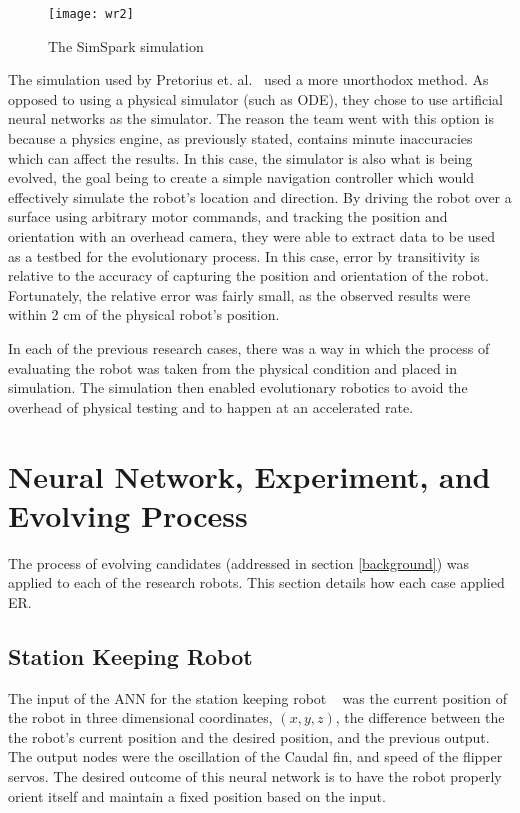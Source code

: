 \documentclass{sig-alternate}
\begin{document}
 \begin{figure}%
 \begin{center}
  \texttt{[image: wr2]}
 \end{center}
\caption{The SimSpark simulation}
\label{fig:simSpark}
\end{figure}
 
 The simulation used by Pretorius et. al.~\cite{Pretorius:2009:TAN:1632149.1632171} used a more unorthodox method. As opposed to using a physical simulator (such as ODE), they chose to use artificial neural networks as the simulator. The reason the team went with this option is because a physics engine, as previously stated, contains minute inaccuracies which can affect the results. In this case, the simulator is also what is being evolved, the goal being to create a simple navigation controller which would effectively simulate the robot's location and direction. By driving the robot over a surface using arbitrary motor commands, and tracking the position and orientation with an overhead camera, they were able to extract data to be used as a testbed for the evolutionary process. In this case, error by transitivity is relative to the accuracy of capturing the position and orientation of the robot. Fortunately, the relative error was fairly small, as the observed results were within 2 cm of the physical robot's position. 
 
 In each of the previous research cases, there was a way in which the process of evaluating the robot was taken from the physical condition and placed in simulation. The simulation then enabled evolutionary robotics to avoid the overhead of physical testing and to happen at an accelerated rate.

\section{Neural Network, Experiment, and Evolving Process}\label{evolution}
  The process of evolving candidates (addressed in section \ref{background}) was applied to each of the research robots. This section details how each case applied ER.
  \subsection{Station Keeping Robot}\label{Moore Evolving}
  The input of the ANN for the station keeping robot ~\cite{Moore:2013:ESK:2463372.2463402} was the current position of the robot in three dimensional coordinates, $(x,y,z)$, the difference between the the robot's current position and the desired position, and the previous output. The output nodes were the oscillation of the Caudal fin, and speed of the flipper servos. The desired outcome of this neural network is to have the robot properly orient itself and maintain a fixed position based on the input.
  
\end{document}
